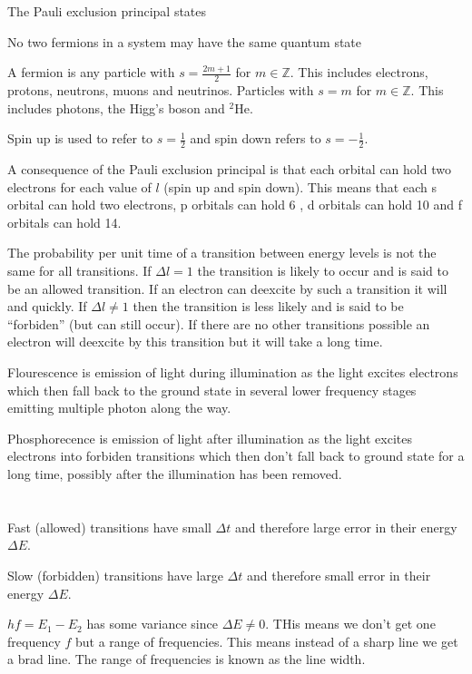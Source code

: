 \documentclass{article}
\newcommand{\bb}[1]{\mathbb{#1}}
\begin{document}
The Pauli exclusion principal states

\begin{displayquote}
No two fermions in a system may have the same quantum state
\end{displayquote}

A fermion is any particle with \(s=\frac{2m+1}{2}\) for \(m\in\bb Z\). This includes electrons, protons, neutrons, muons and neutrinos. Particles with \(s=m\) for \(m\in\bb Z\). This includes photons, the Higg's boson and \(^2\)He.

Spin up is used to refer to \(s=\frac12\) and spin down refers to \(s=-\frac12\).

A consequence of the Pauli exclusion principal is that each orbital can hold two electrons for each value of \(l\) (spin up and spin down). This means that each s orbital can hold two electrons, p orbitals can hold 6 , d orbitals can hold 10 and f orbitals can hold 14.

The probability per unit time of a transition between energy levels is not the same for all transitions. If \(\Delta l=1\) the transition is likely to occur and is said to be an allowed transition. If an electron can deexcite by such a transition it will and quickly. If \(\Delta l\ne 1\) then the transition is less likely and is said to be ``forbiden'' (but can still occur). If there are no other transitions possible an electron will deexcite by this transition but it will take a long time.

Flourescence is emission of light during illumination as the light excites electrons which then fall back to the ground state in several lower frequency stages emitting multiple photon along the way.

Phosphorecence is emission of light after illumination as the light excites electrons into forbiden transitions which then don't fall back to ground state for a long time, possibly after the illumination has been removed.

\section{}

Fast (allowed) transitions have small \(\Delta t\) and therefore large error in their energy \(\Delta E\).

Slow (forbidden) transitions have large \(\Delta t\) and therefore small error in their energy \(\Delta E\).

\(hf=E_1-E_2\) has some variance since \(\Delta E\ne 0\). THis means we don't get one frequency \(f\) but a range of frequencies. This means instead of a sharp line we get a brad line. The range of frequencies is known as the line width.
\end{document}
